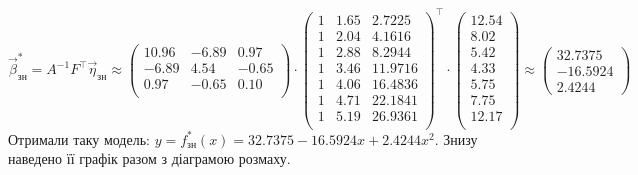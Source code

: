 \documentclass[12 pt]{article}
\begin{document}
$$
\vec{\beta}^*_{\text{зн}} = A^{-1}F^\top \vec{\eta}_{\text{зн}} \approx
\begin{pmatrix}
    10.96 &-6.89 &0.97 \\
    -6.89 &4.54 &-0.65 \\
    0.97 &-0.65 &0.10 \\
\end{pmatrix}
\cdot 
\begin{pmatrix}1 &1.65 &2.7225 \\
    1 &2.04 &4.1616 \\
    1 &2.88 &8.2944 \\
    1 &3.46 &11.9716 \\
    1 &4.06 &16.4836 \\
    1 &4.71 &22.1841 \\
    1 &5.19 &26.9361 \\
\end{pmatrix}^\top
\cdot 
\begin{pmatrix}12.54 \\8.02 \\5.42 \\4.33 \\5.75 \\7.75 \\12.17 \\\end{pmatrix}
\approx
\begin{pmatrix}
    32.7375 \\ 
    -16.5924 \\ 
    2.4244 
\end{pmatrix}
$$
Отримали таку модель: $y=f_{\text{зн}}^*(x) = 32.7375 - 16.5924x + 2.4244x^2$. Знизу наведено її графік
разом з діаграмою розмаху. \\
\begin{center}
    \end{center}
\end{document}
